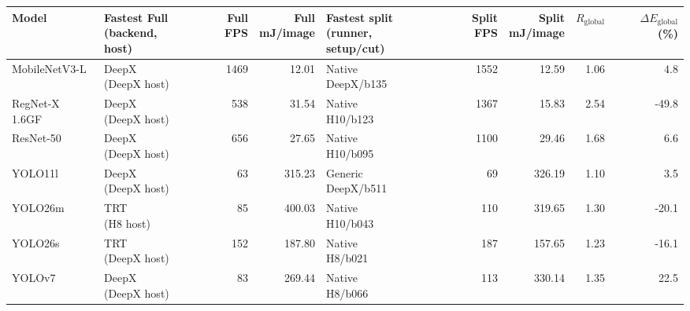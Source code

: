 \label{tab:fastest-deployments}
\begingroup\small\setlength{\tabcolsep}{3pt}
\begin{tabular}{l l r r l r r r r}
\toprule
Model & \shortstack{Fastest Full\\(backend, host)} & Full FPS & \shortstack{Full\\mJ/image} & \shortstack{Fastest split\\(runner, setup/cut)} & Split FPS & \shortstack{Split\\mJ/image} & $R_{\mathrm{global}}$ & \shortstack{$\Delta E_{\mathrm{global}}$\\(\%)} \\
\midrule
MobileNetV3-L & \shortstack[l]{DeepX\\(DeepX host)} & 1469 & 12.01 & \shortstack[l]{Native\\DeepX/b135} & 1552 & 12.59 & 1.06 & 4.8 \\
RegNet-X 1.6GF & \shortstack[l]{DeepX\\(DeepX host)} & 538 & 31.54 & \shortstack[l]{Native\\H10/b123} & 1367 & 15.83 & 2.54 & -49.8 \\
ResNet-50 & \shortstack[l]{DeepX\\(DeepX host)} & 656 & 27.65 & \shortstack[l]{Native\\H10/b095} & 1100 & 29.46 & 1.68 & 6.6 \\
YOLO11l & \shortstack[l]{DeepX\\(DeepX host)} & 63 & 315.23 & \shortstack[l]{Generic\\DeepX/b511} & 69 & 326.19 & 1.10 & 3.5 \\
YOLO26m & \shortstack[l]{TRT\\(H8 host)} & 85 & 400.03 & \shortstack[l]{Native\\H10/b043} & 110 & 319.65 & 1.30 & -20.1 \\
YOLO26s & \shortstack[l]{TRT\\(DeepX host)} & 152 & 187.80 & \shortstack[l]{Native\\H8/b021} & 187 & 157.65 & 1.23 & -16.1 \\
YOLOv7 & \shortstack[l]{DeepX\\(DeepX host)} & 83 & 269.44 & \shortstack[l]{Native\\H8/b066} & 113 & 330.14 & 1.35 & 22.5 \\
\bottomrule
\end{tabular}
\endgroup

